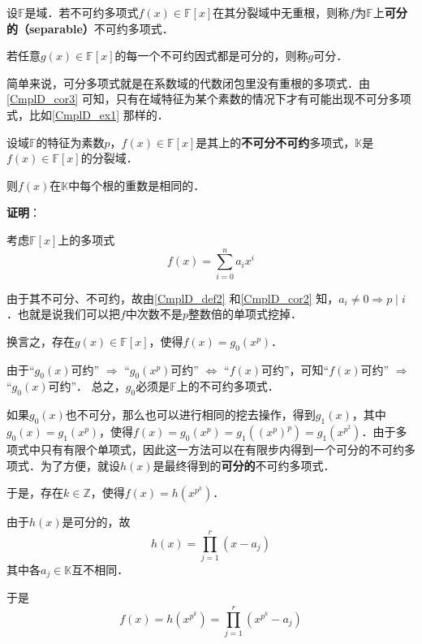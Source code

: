 \begin{definition}{}\label{CmplD_def2}

设$\mathbb{F}$是域．若不可约多项式$f(x)\in\mathbb{F}[x]$在其分裂域中无重根，则称$f$为$\mathbb{F}$上\textbf{可分的（separable）}不可约多项式．

若任意$g(x)\in\mathbb{F}[x]$的每一个不可约因式都是可分的，则称$g$可分．

\end{definition}

简单来说，可分多项式就是在系数域的代数闭包里没有重根的多项式．由\autoref{CmplD_cor3} 可知，只有在域特征为某个素数的情况下才有可能出现不可分多项式，比如\autoref{CmplD_ex1} 那样的．


\begin{theorem}{}
设域$\mathbb{F}$的特征为素数$p$，$f(x)\in\mathbb{F}[x]$是其上的\textbf{不可分不可约}多项式，$\mathbb{K}$是$f(x)\in\mathbb{F}[x]$的分裂域．

则$f(x)$在$\mathbb{K}$中每个根的重数是相同的．
\end{theorem}

\textbf{证明}：

考虑$\mathbb{F}[x]$上的多项式
\begin{equation}
f(x) = \sum_{i=0}^n a_ix^i
\end{equation}


由于其不可分、不可约，故由\autoref{CmplD_def2} 和\autoref{CmplD_cor2} 知，$a_i\neq 0 \Rightarrow p\mid i$．也就是说我们可以把$f$中次数不是$p$整数倍的单项式挖掉．

换言之，存在$g(x)\in\mathbb{F}[x]$，使得$f(x)=g_0(x^p)$．

由于“$g_0(x)$可约” $\Rightarrow$ “$g_0(x^p)$可约” $\iff$ “$f(x)$可约”，可知“$f(x)$可约” $\Rightarrow$ “$g_0(x)$可约”． 总之，$g_0$必须是$\mathbb{F}$上的不可约多项式．

如果$g_0(x)$也不可分，那么也可以进行相同的挖去操作，得到$g_1(x)$，其中$g_0(x) = g_1(x^p)$，使得$f(x) = g_0(x^p) = g_1((x^p)^p) = g_1(x^{p^2})$．由于多项式中只有有限个单项式，因此这一方法可以在有限步内得到一个可分的不可约多项式．为了方便，就设$h(x)$是最终得到的\textbf{可分的}不可约多项式．

于是，存在$k\in\mathbb{Z}$，使得$f(x) = h(x^{p^k})$．

由于$h(x)$是可分的，故
\begin{equation}
h(x) = \prod_{j=1}^{r}(x-a_j)
\end{equation}
其中各$a_j\in\mathbb{K}$互不相同．

于是
\begin{equation}
f(x) = h(x^{p^k}) = \prod_{j=1}^{r}(x^{p^k}-a_j)
\end{equation}

